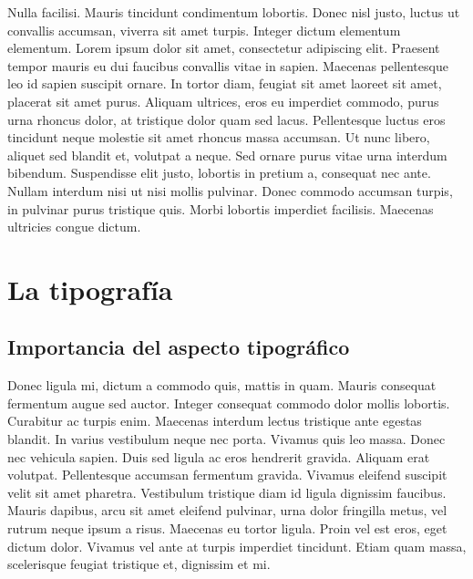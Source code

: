 \documentclass[11pt,a4paper]{report}
\begin{document}
Nulla facilisi. Mauris tincidunt condimentum lobortis. Donec nisl justo, luctus ut convallis accumsan, viverra sit amet turpis. Integer dictum elementum elementum. Lorem ipsum dolor sit amet, consectetur adipiscing elit. Praesent tempor mauris eu dui faucibus convallis vitae in sapien. Maecenas pellentesque leo id sapien suscipit ornare. In tortor diam, feugiat sit amet laoreet sit amet, placerat sit amet purus. Aliquam ultrices, eros eu imperdiet commodo, purus urna rhoncus dolor, at tristique dolor quam sed lacus. Pellentesque luctus eros tincidunt neque molestie sit amet rhoncus massa accumsan. Ut nunc libero, aliquet sed blandit et, volutpat a neque. Sed ornare purus vitae urna interdum bibendum. Suspendisse elit justo, lobortis in pretium a, consequat nec ante. Nullam interdum nisi ut nisi mollis pulvinar. Donec commodo accumsan turpis, in pulvinar purus tristique quis. Morbi lobortis imperdiet facilisis. Maecenas ultricies congue dictum.














\chapter{La tipografía}








\section{Importancia del aspecto tipográfico}

Donec ligula mi, dictum a commodo quis, mattis in quam. Mauris consequat fermentum augue sed auctor. Integer consequat commodo dolor mollis lobortis. Curabitur ac turpis enim. Maecenas interdum lectus tristique ante egestas blandit. In varius vestibulum neque nec porta. Vivamus quis leo massa. Donec nec vehicula sapien. Duis sed ligula ac eros hendrerit gravida. Aliquam erat volutpat. Pellentesque accumsan fermentum gravida. Vivamus eleifend suscipit velit sit amet pharetra. Vestibulum tristique diam id ligula dignissim faucibus. Mauris dapibus, arcu sit amet eleifend pulvinar, urna dolor fringilla metus, vel rutrum neque ipsum a risus. Maecenas eu tortor ligula. Proin vel est eros, eget dictum dolor. Vivamus vel ante at turpis imperdiet tincidunt. Etiam quam massa, scelerisque feugiat tristique et, dignissim et mi.
\end{document}
